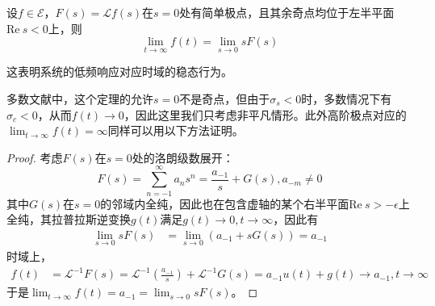 \documentclass{ctexbook}
\begin{document}
\begin{theorem}[终值定理]
    设$f\in\mathcal{E} $，$F(s)=\mathcal{L} f(s)$在$s=0$处有简单极点，且其余奇点均位于左半平面$\text{Re}\ s<0$上，则
    \[\lim_{t\to\infty}f(t)=\lim_{s\to 0}sF(s)\]
\end{theorem}
这表明系统的低频响应对应时域的稳态行为。
\begin{remark}
多数文献中，这个定理的允许$s=0$不是奇点，但由于$\sigma_s<0$时，多数情况下有$\sigma_c<0$，从而$f(t)\to 0$，因此这里我们只考虑非平凡情形。此外高阶极点对应的$\lim_{t\to\infty}f(t)=\infty$同样可以用以下方法证明。
\end{remark}
\begin{proof}
    考虑$F(s)$在$s=0$处的洛朗级数展开：
    \[F(s)=\sum_{n=-1}^{\infty}a_n s^n=\frac{a_{-1}}{s}+G(s),a_{-m}\neq 0\]
    其中$G(s)$在$s=0$的邻域内全纯，因此也在包含虚轴的某个右半平面$\text{Re}\ s>-\epsilon$上全纯，其拉普拉斯逆变换$g(t)$满足$g(t)\to 0,t\to\infty$，因此有\begin{align*}
        \lim_{s\to 0}sF(s)&=\lim_{s\to 0}\left(a_{-1}+sG(s)\right)=a_{-1}
    \end{align*}
    时域上，\begin{align*}
        f(t)&=\mathcal{L}^{-1} F(s)=\mathcal{L}^{-1}\left(\frac{a_{-1}}{s}\right)+\mathcal{L}^{-1} G(s)=a_{-1}u(t)+g(t)\to a_{-1},t\to\infty
    \end{align*}
    于是$\lim_{t\to\infty}f(t)=a_{-1}=\lim_{s\to 0}sF(s)$。
\end{proof}


\end{document}
